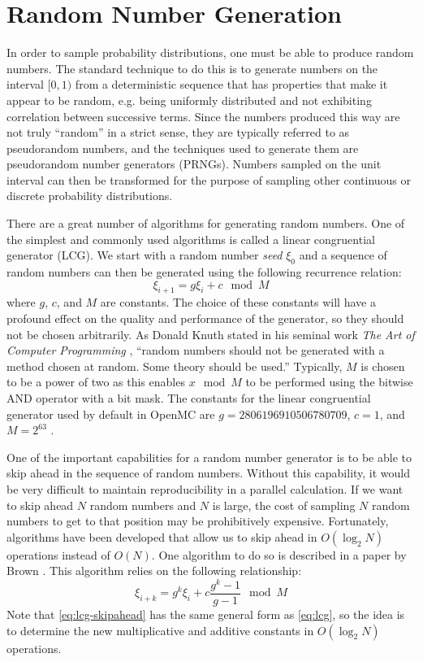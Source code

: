 \section{Random Number Generation}

In order to sample probability distributions, one must be able to produce random
numbers. The standard technique to do this is to generate numbers on the
interval $[0,1)$ from a deterministic sequence that has properties that make it
  appear to be random, e.g. being uniformly distributed and not exhibiting
  correlation between successive terms. Since the numbers produced this way are
  not truly ``random'' in a strict sense, they are typically referred to as
  pseudorandom numbers, and the techniques used to generate them are
  pseudorandom number generators (PRNGs). Numbers sampled on the unit interval
  can then be transformed for the purpose of sampling other continuous or
  discrete probability distributions.

There are a great number of algorithms for generating random numbers. One of the
simplest and commonly used algorithms is called a linear congruential generator
(LCG). We start with a random number \emph{seed} $\xi_0$ and a sequence of
random numbers can then be generated using the following recurrence relation:
\begin{equation}
  \label{eq:lcg}
  \xi_{i+1} = g \xi_i + c \mod M
\end{equation}
where $g$, $c$, and $M$ are constants. The choice of these constants will have a
profound effect on the quality and performance of the generator, so they should
not be chosen arbitrarily. As Donald Knuth stated in his seminal work \emph{The
  Art of Computer Programming} \cite{knuth-2006}, ``random numbers should not be
generated with a method chosen at random. Some theory should be used.''
Typically, $M$ is chosen to be a power of two as this enables $x \mod M$ to be
performed using the bitwise AND operator with a bit mask. The constants for the
linear congruential generator used by default in OpenMC are $g =
2806196910506780709$, $c = 1$, and $M = 2^{63}$ \cite{mathcomp-lecuyer-1999}.

One of the important capabilities for a random number generator is to be able to
skip ahead in the sequence of random numbers. Without this capability, it would
be very difficult to maintain reproducibility in a parallel calculation. If we
want to skip ahead $N$ random numbers and $N$ is large, the cost of sampling $N$
random numbers to get to that position may be prohibitively
expensive. Fortunately, algorithms have been developed that allow us to skip
ahead in $O(\log_2 N)$ operations instead of $O(N)$. One algorithm to do so is
described in a paper by Brown \cite{trans-brown-1994}. This algorithm relies on
the following relationship:
\begin{equation}
  \label{eq:lcg-skipahead}
  \xi_{i+k} = g^k \xi_i + c \frac{g^k - 1}{g - 1} \mod M
\end{equation}
Note that \eqref{eq:lcg-skipahead} has the same general form as \eqref{eq:lcg},
so the idea is to determine the new multiplicative and additive constants in
$O(\log_2 N)$ operations.

